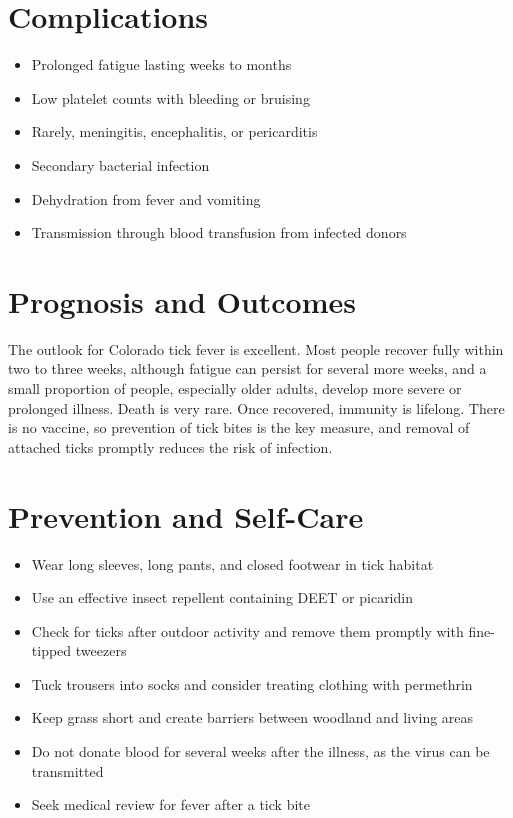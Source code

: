 \section*{Complications}
\begin{itemize}
    \item Prolonged fatigue lasting weeks to months
    \item Low platelet counts with bleeding or bruising
    \item Rarely, meningitis, encephalitis, or pericarditis
    \item Secondary bacterial infection
    \item Dehydration from fever and vomiting
    \item Transmission through blood transfusion from infected donors
\end{itemize}

\section*{Prognosis and Outcomes}
The outlook for Colorado tick fever is excellent. Most people recover fully within two to three weeks, although fatigue can persist for several more weeks, and a small proportion of people, especially older adults, develop more severe or prolonged illness. Death is very rare. Once recovered, immunity is lifelong. There is no vaccine, so prevention of tick bites is the key measure, and removal of attached ticks promptly reduces the risk of infection.

\section*{Prevention and Self-Care}
\begin{itemize}
    \item Wear long sleeves, long pants, and closed footwear in tick habitat
    \item Use an effective insect repellent containing DEET or picaridin
    \item Check for ticks after outdoor activity and remove them promptly with fine-tipped tweezers
    \item Tuck trousers into socks and consider treating clothing with permethrin
    \item Keep grass short and create barriers between woodland and living areas
    \item Do not donate blood for several weeks after the illness, as the virus can be transmitted
    \item Seek medical review for fever after a tick bite
\end{itemize}

